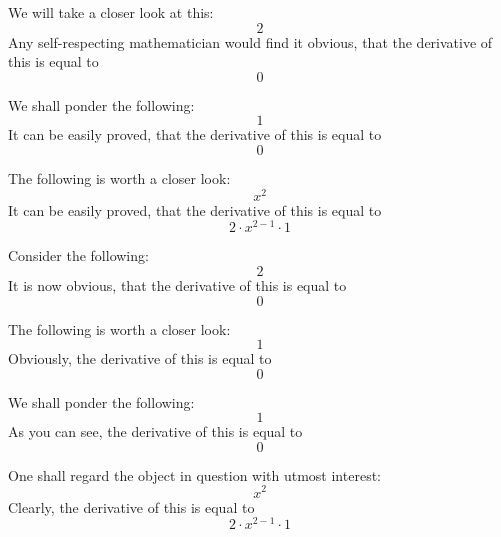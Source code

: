 \documentclass{article}
\begin{document}
We will take a closer look at this:
\begin{equation}
2 
\end{equation}
Any self-respecting mathematician would find it obvious, that the derivative of this is equal to
\begin{equation}
0 
\end{equation}

We shall ponder the following:
\begin{equation}
1 
\end{equation}
It can be easily proved, that the derivative of this is equal to
\begin{equation}
0 
\end{equation}

The following is worth a closer look:
\begin{equation}
x ^{2 } 
\end{equation}
It can be easily proved, that the derivative of this is equal to
\begin{equation}
2 \cdot x ^{2 - 1 } \cdot 1 
\end{equation}

Consider the following:
\begin{equation}
2 
\end{equation}
It is now obvious, that the derivative of this is equal to
\begin{equation}
0 
\end{equation}

The following is worth a closer look:
\begin{equation}
1 
\end{equation}
Obviously, the derivative of this is equal to
\begin{equation}
0 
\end{equation}

We shall ponder the following:
\begin{equation}
1 
\end{equation}
As you can see, the derivative of this is equal to
\begin{equation}
0 
\end{equation}

One shall regard the object in question with utmost interest:
\begin{equation}
x ^{2 } 
\end{equation}
Clearly, the derivative of this is equal to
\begin{equation}
2 \cdot x ^{2 - 1 } \cdot 1 
\end{equation}
\end{document}
